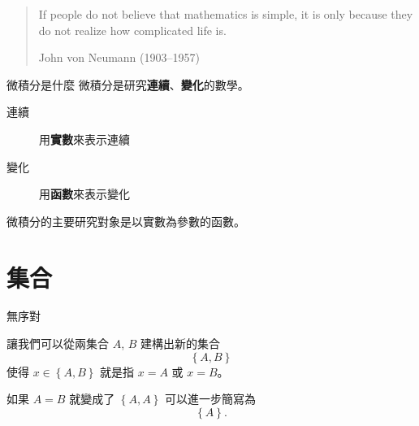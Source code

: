 \documentclass{Slideshow}
\begin{document}
\begin{frame}
    \begin{quote}
        If people do not believe that mathematics is simple, it is only because
        they do not realize how complicated life is.

        \begin{flushright}
            \textup{John von Neumann (1903--1957)}
        \end{flushright}
    \end{quote}
\end{frame}

\begin{frame}{微積分是什麼}
    微積分是研究\textbf{連續}、\textbf{變化}的數學。

    \begin{description}
        \item[連續] 用\textbf{實數}來表示連續
        \item[變化] 用\textbf{函數}來表示變化
    \end{description}

    微積分的主要研究對象是以實數為參數的函數。
\end{frame}

\section{集合}

\begin{frame}{無序對}
    \begin{definition}
        \newcommand{\thepair}{\left\{ A, B \right\}}
        讓我們可以從兩集合 $A$, $B$ 建構出新的集合
        \[ \thepair \]
        使得 $x \in \thepair$ 就是指 $x = A$ 或 $x = B$。
    \end{definition}

    如果 $A = B$ 就變成了 $\left\{ A, A \right\}$ 可以進一步簡寫為
    \[ \left\{ A \right\}.\]
\end{frame}
\end{document}
